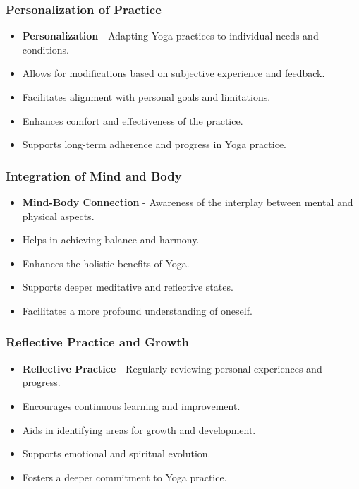 \begin{frame}[fragile]\frametitle{Personalization of Practice}

      \begin{itemize}
		\item \textbf{Personalization} - Adapting Yoga practices to individual needs and conditions.
		\item Allows for modifications based on subjective experience and feedback.
		\item Facilitates alignment with personal goals and limitations.
		\item Enhances comfort and effectiveness of the practice.
		\item Supports long-term adherence and progress in Yoga practice.
	  \end{itemize}

\end{frame}

\begin{frame}[fragile]\frametitle{Integration of Mind and Body}

      \begin{itemize}
		\item \textbf{Mind-Body Connection} - Awareness of the interplay between mental and physical aspects.
		\item Helps in achieving balance and harmony.
		\item Enhances the holistic benefits of Yoga.
		\item Supports deeper meditative and reflective states.
		\item Facilitates a more profound understanding of oneself.
	  \end{itemize}

\end{frame}

\begin{frame}[fragile]\frametitle{Reflective Practice and Growth}

      \begin{itemize}
		\item \textbf{Reflective Practice} - Regularly reviewing personal experiences and progress.
		\item Encourages continuous learning and improvement.
		\item Aids in identifying areas for growth and development.
		\item Supports emotional and spiritual evolution.
		\item Fosters a deeper commitment to Yoga practice.
	  \end{itemize}

\end{frame}

